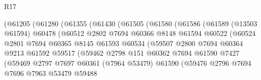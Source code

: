 \begin{lexlean}{R17}
\begin{coremodule}
                        (@61205
                          (@61280
                            (@61355
                              (@61430
                                (@61505
                                  (@61580
                                    (@61586
                                      (@61589
                                        (@13503 @61594)
                                        @60478
                                        (@60512
                                          @2802
                                          @7694
                                          @60366
                                          @8148
                                          @61594
                                          @60522
                                          (@60524
                                            @2801
                                            @7694
                                            @60365
                                            @8145
                                            @61593
                                            @60534
                                            (@59507
                                              @2800
                                              @7694
                                              @60364
                                              @9213
                                              @61592
                                              @59517
                                              (@59462
                                                @2798
                                                @151
                                                @60362
                                                @7694
                                                @61590
                                                @7427
                                                (@59469
                                                  @2797
                                                  @7697
                                                  @60361
                                                  (@7964 @53479)
                                                  @61590
                                                  (@59476
                                                    @2796
                                                    @7694
                                                    @7696
                                                    @7963
                                                    @53479
                                                    @59488

\end{coremodule}
\end{lexlean}
